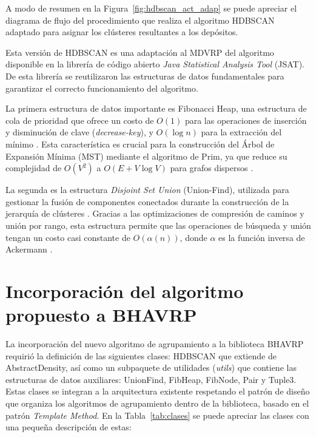 A modo de resumen en la Figura~\ref{fig:hdbscan_act_adap} se puede apreciar el diagrama de flujo del procedimiento que realiza el algoritmo HDBSCAN adaptado para asignar los clústeres resultantes a los depósitos.


Esta versión de HDBSCAN es una adaptación al MDVRP del algoritmo disponible en la librería de código abierto \textit{Java Statistical Analysis Tool} (JSAT)\parencite{raffJSATJavaStatistical}. De esta librería se reutilizaron las estructuras de datos fundamentales para garantizar el correcto funcionamiento del algoritmo. 

La primera estructura de datos importante es Fibonacci Heap, una estructura de cola de prioridad que ofrece un costo de \(O(1)\) para las operaciones de inserción y disminución de clave (\textit{decrease-key}), y \(O(\log n)\) para la extracción del mínimo \parencite{fredmanFibonacciHeapsUses1987}. Esta característica es crucial para la construcción del Árbol de Expansión Mínima (MST) mediante el algoritmo de Prim, ya que reduce su complejidad de \(O(V^2)\) a \(O(E + V \log V)\) para grafos dispersos \parencite{cormenIntroductionAlgorithms2009}. 

La segunda es la estructura \textit{Disjoint Set Union} (Union-Find), utilizada para gestionar la fusión de componentes conectados durante la construcción de la jerarquía de clústeres \parencite{gallerImprovedEquivalenceAlgorithm1964}. Gracias a las optimizaciones de compresión de caminos y unión por rango, esta estructura permite que las operaciones de búsqueda y unión tengan un costo casi constante de \(O(\alpha(n))\), donde \(\alpha\) es la función inversa de Ackermann \parencite{tarjanWorstcaseAnalysisSet1984}. 

\section{Incorporación del algoritmo propuesto a BHAVRP}

La incorporaci\'on del nuevo algoritmo de agrupamiento a la biblioteca BHAVRP requiri\'o la definici\'on de las siguientes clases:  HDBSCAN que extiende de AbstractDensity, así como un subpaquete de utilidades (\textit{utils}) que contiene las estructuras de datos auxiliares: UnionFind, FibHeap,  FibNode, Pair y Tuple3. Estas clases se integran a la arquitectura existente respetando el patr\'on de dise\~no que organiza los algoritmos de agrupamiento dentro de la biblioteca, basado en el patr\'on \textit{Template Method}. En la Tabla~\ref{tab:clases} se puede apreciar las clases con una peque\~na descripci\'on de estas:

